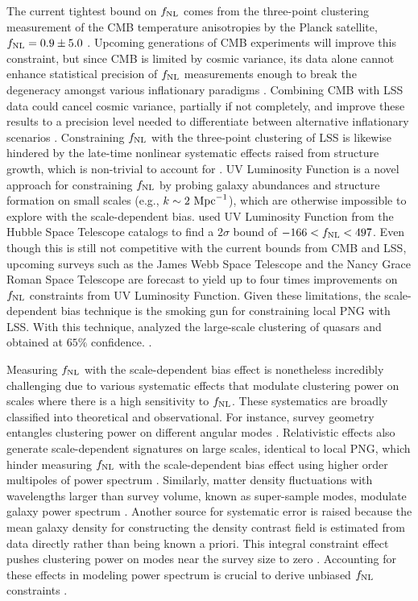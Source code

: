 The current tightest bound on $f_{\rm NL}$ comes from the three-point clustering measurement of the CMB temperature anisotropies by the Planck satellite, $f_{\rm NL}=0.9\pm 5.0$ \citep{akrami2019planck}. Upcoming generations of CMB experiments will improve this constraint, but since CMB is limited by cosmic variance, its data alone cannot enhance statistical precision of $f_{\rm NL}$ measurements enough to break the degeneracy amongst various inflationary paradigms \citep[see, e.g.,][]{ade2019simons}. Combining CMB with LSS data could cancel cosmic variance, partially if not completely, and improve these results to a precision level needed to differentiate between alternative inflationary scenarios \citep[see, e.g.,][]{schmittfull2018PhRvD}. Constraining $f_{\rm NL}$ with the three-point clustering of LSS is likewise hindered by the late-time nonlinear systematic effects raised from structure growth, which is non-trivial to account for \citep{baldauf2011galaxy, baldauf2011primordial}. UV Luminosity Function is a novel approach for constraining $f_{\rm NL}$ by probing galaxy abundances and structure formation on small scales (e.g., $k \sim 2~{\rm Mpc}^{-1}$), which are otherwise impossible to explore with the scale-dependent bias. \cite{sabti2021JCAP} used UV Luminosity Function from the Hubble Space Telescope catalogs \citep{bouwens2015ApJ} to find a $2\sigma$ bound of $-166<f_{\rm NL}<497$. Even though this is still not competitive with the current bounds from CMB and LSS, upcoming surveys such as the James Webb Space Telescope and the Nancy Grace Roman Space Telescope are forecast to yield up to four times improvements on $
f_{\rm NL}$ constraints from UV Luminosity Function. Given these limitations, the scale-dependent bias technique is the smoking gun for constraining local PNG with LSS. With this technique, \cite{mueller2022primordial} analyzed the large-scale clustering of quasars and obtained  at $65\%$ confidence. .

Measuring $f_{\rm NL}$ with the scale-dependent bias effect is nonetheless incredibly challenging due to various systematic effects that modulate clustering power on scales where there is a high sensitivity to $f_{\rm NL}$. These systematics are broadly classified into theoretical and observational. For instance, survey geometry entangles clustering power on different angular modes \citep{beutler2014clustering,wilson2017rapid}. Relativistic effects also generate scale-dependent signatures on large scales, identical to local PNG, which hinder measuring $f_{\rm NL}$ with the scale-dependent bias effect using higher order multipoles of power spectrum \citep{wang2020}. Similarly, matter density fluctuations with wavelengths larger than survey volume, known as super-sample modes, modulate galaxy power spectrum \citep{castorina2020JCAP}. Another source for systematic error is raised because the mean galaxy density for constructing the density contrast field is estimated from data directly rather than being known a priori. This integral constraint effect pushes clustering power on modes near the survey size to zero \citep{peacock1991large,de2019integral}. Accounting for these effects in modeling power spectrum is crucial to derive unbiased $f_{\rm NL}$ constraints \citep[see, e.g.,][]{riquelme2022primordial}. 

